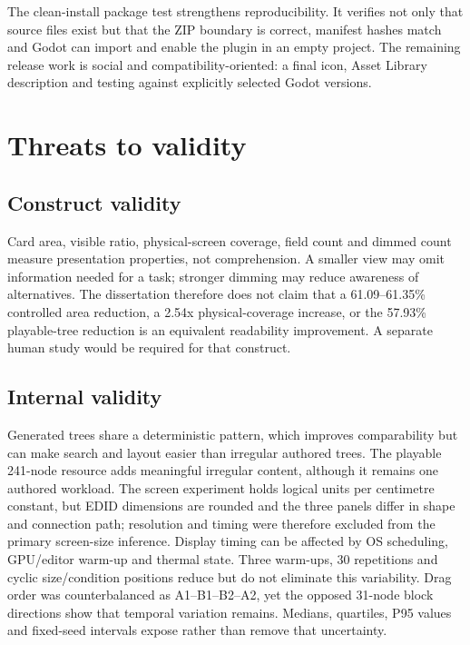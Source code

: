 The clean-install package test strengthens reproducibility. It verifies not only that source files exist but that the ZIP boundary is correct, manifest hashes match and Godot can import and enable the plugin in an empty project. The remaining release work is social and compatibility-oriented: a final icon, Asset Library description and testing against explicitly selected Godot versions.

\section{Threats to validity}

\subsection{Construct validity}

Card area, visible ratio, physical-screen coverage, field count and dimmed count measure presentation properties, not comprehension. A smaller view may omit information needed for a task; stronger dimming may reduce awareness of alternatives. The dissertation therefore does not claim that a 61.09--61.35\% controlled area reduction, a 2.54x physical-coverage increase, or the 57.93\% playable-tree reduction is an equivalent readability improvement. A separate human study would be required for that construct.

\subsection{Internal validity}

Generated trees share a deterministic pattern, which improves comparability but can make search and layout easier than irregular authored trees. The playable 241-node resource adds meaningful irregular content, although it remains one authored workload. The screen experiment holds logical units per centimetre constant, but EDID dimensions are rounded and the three panels differ in shape and connection path; resolution and timing were therefore excluded from the primary screen-size inference. Display timing can be affected by OS scheduling, GPU/editor warm-up and thermal state. Three warm-ups, 30 repetitions and cyclic size/condition positions reduce but do not eliminate this variability. Drag order was counterbalanced as A1--B1--B2--A2, yet the opposed 31-node block directions show that temporal variation remains. Medians, quartiles, P95 values and fixed-seed intervals expose rather than remove that uncertainty.

